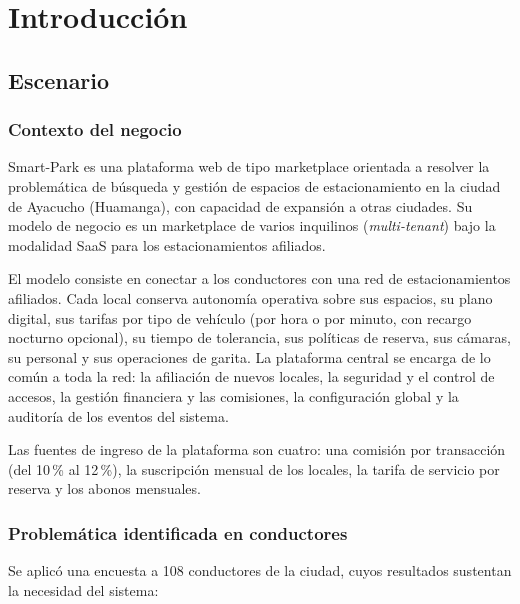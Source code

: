 
\section{Introducción}

\subsection{Escenario}

\subsubsection{Contexto del negocio}

Smart-Park es una plataforma web de tipo marketplace orientada a resolver la problemática de búsqueda y gestión de espacios de estacionamiento en la ciudad de Ayacucho (Huamanga), con capacidad de expansión a otras ciudades. Su modelo de negocio es un marketplace de varios inquilinos (\textit{multi-tenant}) bajo la modalidad SaaS para los estacionamientos afiliados.

El modelo consiste en conectar a los conductores con una red de estacionamientos afiliados. Cada local conserva autonomía operativa sobre sus espacios, su plano digital, sus tarifas por tipo de vehículo (por hora o por minuto, con recargo nocturno opcional), su tiempo de tolerancia, sus políticas de reserva, sus cámaras, su personal y sus operaciones de garita. La plataforma central se encarga de lo común a toda la red: la afiliación de nuevos locales, la seguridad y el control de accesos, la gestión financiera y las comisiones, la configuración global y la auditoría de los eventos del sistema.

Las fuentes de ingreso de la plataforma son cuatro: una comisión por transacción (del 10\,\% al 12\,\%), la suscripción mensual de los locales, la tarifa de servicio por reserva y los abonos mensuales.

\newpage\subsubsection{Problemática identificada en conductores}

Se aplicó una encuesta a 108 conductores de la ciudad, cuyos resultados sustentan la necesidad del sistema:

